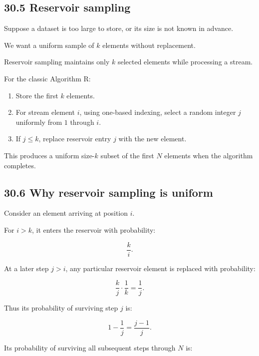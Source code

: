 \subsection{30.5 Reservoir sampling}\label{02-foundations-ii-ch031-reservoir-sampling}

\hypertarget{02-foundations-ii-ch031-reservoir-sampling}{}

Suppose a dataset is too large to store, or its size is not known in advance.

We want a uniform sample of \(k\) elements without replacement.

Reservoir sampling maintains only \(k\) selected elements while processing a stream.

For the classic Algorithm R:

\begin{enumerate}
\def\labelenumi{\arabic{enumi}.}
\tightlist
\item
  Store the first \(k\) elements.
\item
  For stream element \(i\), using one-based indexing, select a random integer \(j\) uniformly from \(1\) through \(i\).
\item
  If \(j\le k\), replace reservoir entry \(j\) with the new element.
\end{enumerate}

This produces a uniform size-\(k\) subset of the first \(N\) elements when the algorithm completes.

\subsection{30.6 Why reservoir sampling is uniform}\label{02-foundations-ii-ch031-why-reservoir-sampling-is-uniform}

\hypertarget{02-foundations-ii-ch031-why-reservoir-sampling-is-uniform}{}

Consider an element arriving at position \(i\).

For \(i>k\), it enters the reservoir with probability:

\[ \frac{k}{i}. \]

At a later step \(j>i\), any particular reservoir element is replaced with probability:

\[ \frac{k}{j}\cdot\frac1k=\frac1j. \]

Thus its probability of surviving step \(j\) is:

\[ 1-\frac1j=\frac{j-1}{j}. \]

Its probability of surviving all subsequent steps through \(N\) is:

